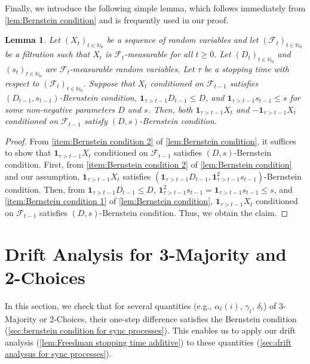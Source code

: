 \documentclass[letterpaper,11pt]{article}
\newtheorem{lemma}[theorem]{Lemma}
\newcommand{\indicator}{\mathbf{1}}
\newcommand{\Nat}{\mathbb{N}}
\newcommand{\calF}{\mathcal{F}}
\newcommand{\alphanorm}{\gamma}
\newcommand{\bounded}{D}
\newcommand{\variance}{s}
\begin{document}
Finally, we introduce the following simple lemma, which follows immediately from \cref{lem:Bernstein condition} and is frequently used in our proof.
   \begin{lemma}
      \label{lem:BC for SP}
      Let $(X_t)_{t\in \Nat_0}$ be a sequence of random variables and
      let $(\calF_t)_{t\in\Nat_0}$ be a filtration such that $ X_t $ is $ \calF_t $-measurable for all $t\ge 0$.
      Let $(\bounded_{t})_{t\in \Nat_0}$ and $(\variance_{t})_{t\in \Nat_0}$ are $ \calF_t $-measurable random variables.
      Let $\tau$ be a stopping time with respect to $(\calF_t)_{t\in \Nat_0}$.
      Suppose that $X_t$ conditioned on $\mathcal{F}_{t-1}$ satisfies $(\bounded_{t-1},\variance_{t-1})$-Bernstein condition, $\indicator_{\tau>t-1} \bounded_{t-1}\leq D$, and $\indicator_{\tau>t-1} \variance_{t-1}\leq \variance$ for some non-negative parameters $\bounded$ and $\variance$.
      Then, 
      both $\indicator_{\tau>t-1}X_t$ and $-\indicator_{\tau>t-1}X_t$ conditioned on $\mathcal{F}_{t-1}$ satisfy $(\bounded,\variance)$-Bernstein condition.
    \end{lemma}
    \begin{proof}
      From \cref{item:Bernstein condition 2} of \cref{lem:Bernstein condition}, it suffices to show that $\indicator_{\tau>t-1}X_t$ conditioned on $\mathcal{F}_{t-1}$ satisfies $(\bounded,\variance)$-Bernstein condition.
      First, from \cref{item:Bernstein condition 2} of \cref{lem:Bernstein condition} and our assumption, $\indicator_{\tau>t-1}X_t$ satisfies $(\indicator_{\tau>t-1}\bounded_{t-1},\indicator_{\tau>t-1}^2\variance_{t-1})$-Bernstein condition.
      Then, from $\indicator_{\tau>t-1}\bounded_{t-1}\leq \bounded$, $\indicator_{\tau>t-1}^2 \variance_{t-1}=\indicator_{\tau>t-1} \variance_{t-1}\leq \variance$, and  \cref{item:Bernstein condition 1} of \cref{lem:Bernstein condition}, 
      $\indicator_{\tau>t-1}X_t$ conditioned on $\mathcal{F}_{t-1}$ satisfies $(\bounded,\variance)$-Bernstein condition.
      Thus, we obtain the claim.
    \end{proof}
\section{Drift Analysis for 3-Majority and 2-Choices} \label{sec:drift analysis}
In this section, we check that for several quantities (e.g., $\alpha_t(i)$, $\alphanorm_t$, $\delta_t$) of 3-Majority or 2-Choices, their one-step difference satisfies the Bernstein condition (\cref{sec:bernstein condition for sync processes}).
This enables us to apply our drift analysis (\cref{lem:Freedman stopping time additive}) to these quantities (\cref{sec:drift analysus for sync processes}).
%
\end{document}
